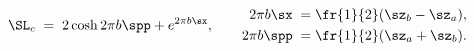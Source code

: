 \begin{equation}\label{lodef}
\SL_{c}\;=\;2\cosh2\pi b\spp+e^{2\pi b \sx},\qquad
\begin{aligned}
2\pi b \sx \;=&\;\fr{1}{2}(\sz_b-\sz_a), \\
2\pi b \spp\;=&\;\fr{1}{2}(\sz_a+\sz_b).
\end{aligned}
\end{equation}

